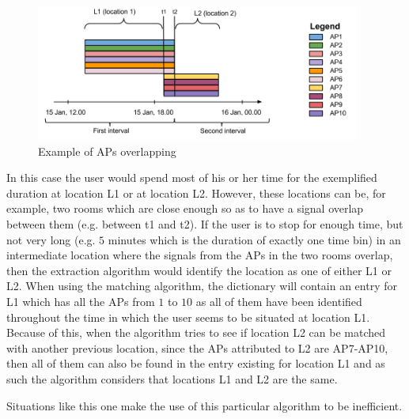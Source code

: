 \begin{figure}[!h]
\centering
\includegraphics[width=0.95\textwidth]{figures/matching/overlap_of_aps.png}
\caption{Example of APs overlapping}
\label{overlap_of_aps}
\end{figure}

In this case the user would spend most of his or her time for the exemplified
duration at location L1 or at location L2. However, these locations can be, for
example, two rooms which are close enough so as to have a signal overlap between
them (e.g. between t1 and t2). If the user is to stop for enough time, but not
very long (e.g. $5$ minutes which is the duration of exactly one time bin) in an
intermediate location where the signals from the APs in the two rooms overlap,
then the extraction algorithm would identify the location as one of either L1 or
L2. When using the matching algorithm, the dictionary will contain an entry for
L1 which has all the APs from $1$ to $10$ as all of them have been identified
throughout the time in which the user seems to be situated at location L1.
Because of this, when the algorithm tries to see if location L2 can be matched
with another previous location, since the APs attributed to L2 are AP7-AP10,
then all of them can also be found in the entry existing for location L1 and as
such the algorithm considers that locations L1 and L2 are the same.

Situations like this one make the use of this particular algorithm to be
inefficient.

